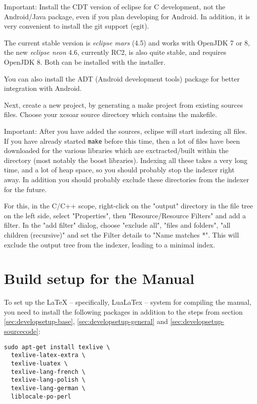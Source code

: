 Important: Install the CDT version of eclipse for C development, not the Android/Java package, even if you plan developing for Android. In addition, it is very convenient to install the git support (egit).

The current stable version is \emph{eclipse mars} (4.5) and works with OpenJDK 7 or 8, the new \emph{eclipse neon} 4.6, currently RC2, is also quite stable, and requires OpenJDK 8. Both can be installed with the installer.

You can also install the ADT (Android development tools) package for better integration with Android.

Next, create a new project, by generating a make project from existing sources files. Choose your xcsoar source directory which contains the makefile.

Important: After you have added the sources, eclipse will start indexing all files. If you have already started \texttt{make} before this time, then a lot of files have been downloaded for the various libraries which are exctracted/built within the \xc directory (most notably the boost libraries). Indexing all these takes a very long time, and a lot of heap space, so you should probably stop the indexer right away. In addition you should probably exclude these directories from the indexer for the future.

For this, in the C/C++ scope, right-click on the "output" directory in the file tree on the left side, select "Properties", then "Resource/Resource Filters" and add a filter. In the "add filter" dialog, choose "exclude all", "files and folders", "all children (recursive)" and set the Filter details to "Name matches *".
This will exclude the output tree from the indexer, leading to a minimal index.

\section{Build setup for the Manual}
To set up the LaTeX -- specifically, LuaLaTex -- system for compiling the manual, you need to install the following packages in addition to the steps from section \ref{sec:developsetup-base}, \ref{sec:developsetup-general} and \ref{sec:developsetup-sourcecode}:

\begin{verbatim}
sudo apt-get install texlive \
  texlive-latex-extra \
  texlive-luatex \
  texlive-lang-french \
  texlive-lang-polish \
  texlive-lang-german \
  liblocale-po-perl
\end{verbatim}

